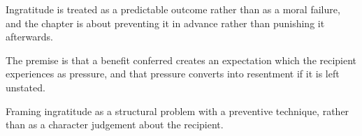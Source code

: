

\begin{distilled}
  \item Ingratitude is treated as a predictable outcome rather than as a moral failure, and the chapter is about preventing it in advance rather than punishing it afterwards.
  \item The premise is that a benefit conferred creates an expectation which the recipient experiences as pressure, and that pressure converts into resentment if it is left unstated.
\end{distilled}

\begin{unique}
  \item Framing ingratitude as a structural problem with a preventive technique, rather than as a character judgement about the recipient.
\end{unique}
